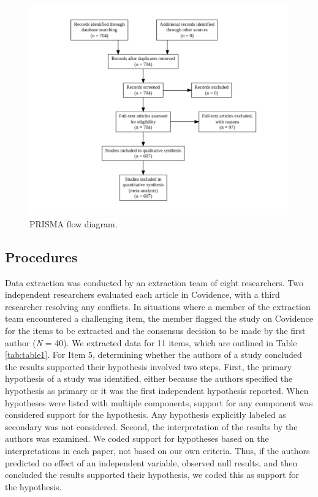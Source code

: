 \documentclass[
  man, donotrepeattitle,mask,floatsintext]{apa7}
\begin{document}
\pagebreak

\begin{figure}

{\centering \includegraphics{../../figs/fig1} 

}

\caption{PRISMA flow diagram.}\label{fig:fig1}
\end{figure}



\pagebreak

\hypertarget{procedures}{%
\subsection{Procedures}\label{procedures}}

Data extraction was conducted by an extraction team of eight researchers. Two independent researchers evaluated each article in Covidence, with a third researcher resolving any conflicts. In situations where a member of the extraction team encountered a challenging item, the member flagged the study on Covidence for the items to be extracted and the consensus decision to be made by the first author (\emph{N} = 40). We extracted data for 11 items, which are outlined in Table \ref{tab:table1}. For Item 5, determining whether the authors of a study concluded the results supported their hypothesis involved two steps. First, the primary hypothesis of a study was identified, either because the authors specified the hypothesis as primary or it was the first independent hypothesis reported. When hypotheses were listed with multiple components, support for any component was considered support for the hypothesis. Any hypothesis explicitly labeled as secondary was not considered. Second, the interpretation of the results by the authors was examined. We coded support for hypotheses based on the interpretations in each paper, not based on our own criteria. Thus, if the authors predicted no effect of an independent variable, observed null results, and then concluded the results supported their hypothesis, we coded this as support for the hypothesis.
\end{document}

